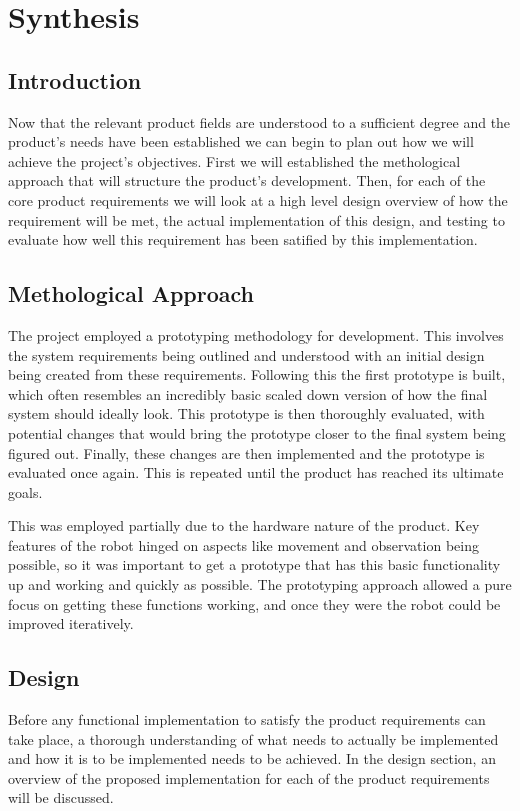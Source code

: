 \part{Synthesis}
	\chapter{Introduction}
	Now that the relevant product fields are understood to a sufficient degree and the product's needs have been established we can begin to plan out how we will achieve the project's objectives. First we will established the methological approach that will structure the product's development. Then, for each of the core product requirements we will look at a high level design overview of how the requirement will be met, the actual implementation of this design, and testing to evaluate how well this requirement has been satified by this implementation.
	
	\chapter{Methological Approach}
	The project employed a prototyping methodology for development. This involves the system requirements being outlined and understood with an initial design being created from these requirements. Following this the first prototype is built, which often resembles an incredibly basic scaled down version of how the final system should ideally look. This prototype is then thoroughly evaluated, with potential changes that would bring the prototype closer to the final system being figured out. Finally, these changes are then implemented and the prototype is evaluated once again. This is repeated until the product has reached its ultimate goals.
	
	
	This was employed partially due to the hardware nature of the product. Key features of the robot hinged on aspects like movement and observation being possible, so it was important to get a prototype that has this basic functionality up and working and quickly as possible. The prototyping approach allowed a pure focus on getting these functions working, and once they were the robot could be improved iteratively.
	
	\chapter{Design}
	
	
	Before any functional implementation to satisfy the product requirements can take place, a thorough understanding of what needs to actually be implemented and how it is to be implemented needs to be achieved. In the design section, an overview of the proposed implementation for each of the product requirements will be discussed. 
	
